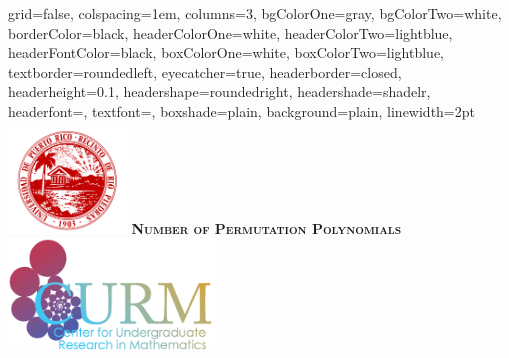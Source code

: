 \documentclass[landscape,final,paperwidth=48in,paperheight=36in]{baposter}
\begin{document}
\begin{poster}%
  {
  grid=false,
  colspacing=1em,
  columns=3,
  bgColorOne=gray,
  bgColorTwo=white,
  borderColor=black,
  headerColorOne=white,
  headerColorTwo=lightblue,
  headerFontColor=black,
  boxColorOne=white,
  boxColorTwo=lightblue,
  textborder=roundedleft,
  eyecatcher=true,
  headerborder=closed,
  headerheight=0.1\textheight,
  headershape=roundedright,
  headershade=shadelr,
  headerfont=\Large\textsc, %
  textfont=\large{\setlength{\parindent}{1.5em}},
  boxshade=plain,
  background=plain,
  linewidth=2pt
  }
  {\includegraphics[height=8em,keepaspectratio=true]{images/logo_uprrp}} 
  {\bf\textsc{Number of Permutation Polynomials}\vspace{0.1em}}
  {}
  {%
    \includegraphics[height=8em,keepaspectratio=true]{images/logo_curm}
  }

    \newcommand{\colouredcircle}{%
      \tikz{\useasboundingbox (-0.2em,-0.32em) rectangle(0.2em,0.32em); \draw[draw=black,fill=lightblue,line width=0.03em] (0,0) circle(0.18em);}}


\end{poster}
\end{document}
